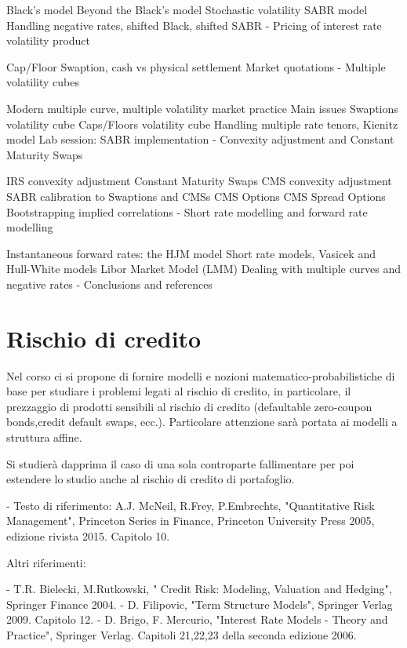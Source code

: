\documentclass[a4paper,10pt]{article}
\begin{document}
Black's model
Beyond the Black's model
Stochastic volatility SABR model
Handling negative rates, shifted Black, shifted SABR
- Pricing of interest rate volatility product

Cap/Floor
Swaption, cash vs physical settlement
Market quotations
- Multiple volatility cubes

Modern multiple curve, multiple volatility market practice
Main issues
Swaptions volatility cube
Caps/Floors volatility cube
Handling multiple rate tenors, Kienitz model
Lab session: SABR implementation
- Convexity adjustment and Constant Maturity Swaps

IRS convexity adjustment
Constant Maturity Swaps
CMS convexity adjustment
SABR calibration to Swaptions and CMSs
CMS Options
CMS Spread Options
Bootstrapping implied correlations
- Short rate modelling and forward rate modelling

Instantaneous forward rates: the HJM model
Short rate models, Vasicek and Hull-White models
Libor Market Model (LMM)
Dealing with multiple curves and negative rates
- Conclusions and references



\section{Rischio di credito}
Nel corso ci si propone di fornire modelli e nozioni matematico-probabilistiche di base per studiare i problemi legati al rischio di credito, in particolare, il prezzaggio di prodotti sensibili al rischio di credito (defaultable zero-coupon bonds,credit default swaps, ecc.). Particolare attenzione sarà portata ai modelli a struttura affine.

Si studierà dapprima il caso di una sola controparte fallimentare per poi estendere lo studio anche al rischio di credito di portafoglio.

- Testo di riferimento: A.J. McNeil, R.Frey, P.Embrechts, "Quantitative Risk Management", Princeton Series in Finance, Princeton University Press 2005, edizione rivista 2015. Capitolo 10.



Altri riferimenti:

- T.R. Bielecki, M.Rutkowski, " Credit Risk: Modeling, Valuation and Hedging", Springer Finance 2004.
- D. Filipovic, "Term Structure Models", Springer Verlag 2009. Capitolo 12.
- D. Brigo, F. Mercurio, "Interest Rate Models - Theory and Practice", Springer Verlag. Capitoli 21,22,23 della seconda edizione 2006.
\end{document}
